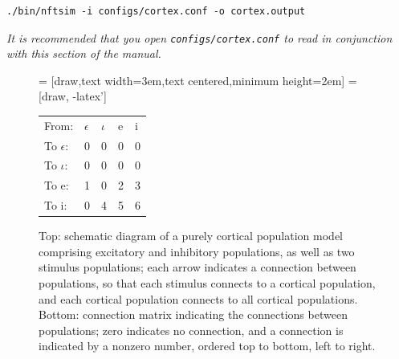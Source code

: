 \documentclass[12pt,a4paper]{article}
\newcommand{\type}[1]{{\small\small\tt #1} }
\begin{document}
\begin{lstlisting}
./bin/nftsim -i configs/cortex.conf -o cortex.output
\end{lstlisting}

{\em It is recommended that you open \type{configs/cortex.conf} to read in conjunction with this section of the manual.}
\vspace{24pt}

\begin{figure}[h!]
\begin{center}
 = [draw,text width=3em,text centered,minimum height=2em]
 = [draw, -latex']
\end{center}
\vspace{0.2cm}
\begin{center}
\begin{tabular}{ l l l l l }
    From:& $\epsilon$ & $\iota$ & e & i \\
    To $\epsilon$:& 0 & 0 & 0 & 0 \\
    To $\iota$:& 0 & 0 & 0 & 0 \\
    To e:& 1 & 0 & 2 & 3 \\
    To i:& 0 & 4 & 5 & 6
\end{tabular}
\end{center}
\caption{Top: schematic diagram of a purely cortical population model comprising excitatory and inhibitory populations, as well as two stimulus populations; each arrow indicates a connection between populations, so that each stimulus connects to a cortical population, and each cortical population connects to all cortical populations. Bottom: connection matrix indicating the connections between populations; zero indicates no connection, and a connection is indicated by a nonzero number, ordered top to bottom, left to right.}
\label{fig:cortical}
\end{figure}
\end{document}
